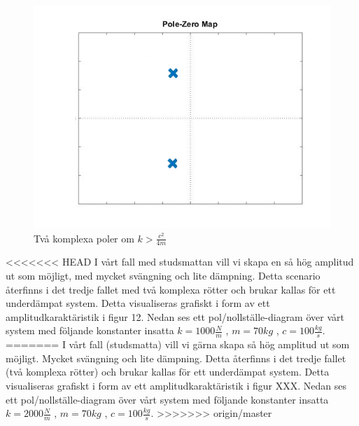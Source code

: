 \documentclass[10pt,a4paper]{article}
\begin{document}
\begin{figure}
\begin{center}
\includegraphics[scale=0.3]{2komplexa}
\caption{Två komplexa poler om $k>\frac{c^2}{4m}$}
\end{center}
\end{figure}
\newpage

<<<<<<< HEAD
I vårt fall med studsmattan vill vi skapa en så hög amplitud ut som möjligt, med mycket svängning och lite dämpning. Detta scenario återfinns i det tredje fallet med två komplexa rötter och brukar kallas för ett underdämpat system. Detta visualiseras grafiskt i form av ett amplitudkaraktäristik i figur 12. Nedan ses ett pol/nollställe-diagram över vårt system med följande konstanter insatta $k=1000\frac{N}{m}$ , $m=70kg$ , $c=100\frac{kg}{s}$.
=======
I vårt fall (studsmatta) vill vi gärna skapa så hög amplitud ut som möjligt. Mycket svängning och lite dämpning. Detta återfinns i det tredje fallet (två komplexa rötter) och brukar kallas för ett underdämpat system. Detta visualiseras grafiskt i form av ett amplitudkaraktäristik i figur XXX. Nedan ses ett pol/nollställe-diagram över vårt system med följande konstanter insatta $k=2000\frac{N}{m}$ , $m=70kg$ , $c=100\frac{kg}{s}$.
>>>>>>> origin/master
\end{document}
